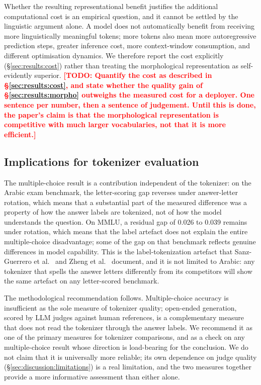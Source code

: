 \documentclass[a4paper,fleqn]{cas-sc}
\newcommand{\todo}[1]{\textcolor{red}{\textbf{[\textsc{TODO}: #1]}}}
\begin{document}
Whether the resulting representational benefit justifies the additional computational cost is an empirical question, and it cannot be settled by the linguistic argument alone. A model does not automatically benefit from receiving more linguistically meaningful tokens; more tokens also mean more autoregressive prediction steps, greater inference cost, more context-window consumption, and different optimisation dynamics. We therefore report the cost explicitly (\S\ref{sec:results:cost}) rather than treating the morphological representation as self-evidently superior.
\todo{Quantify the cost as described in \S\ref{sec:results:cost}, and state whether the quality gain of \S\ref{sec:results:morpho} outweighs the measured cost for a deployer. One sentence per number, then a sentence of judgement. Until this is done, the paper's claim is that the morphological representation is competitive with much larger vocabularies, not that it is more efficient.}

\subsection{Implications for tokenizer evaluation}
\label{sec:discussion:eval}

The multiple-choice result is a contribution independent of the tokenizer: on the Arabic exam benchmark, the letter-scoring gap reverses under answer-letter rotation, which means that a substantial part of the measured difference was a property of how the answer labels are tokenized, not of how the model understands the question. On MMLU, a residual gap of 0.026 to 0.039 remains under rotation, which means that the label artefact does not explain the entire multiple-choice disadvantage; some of the gap on that benchmark reflects genuine differences in model capability. This is the label-tokenization artefact that Sanz-Guerrero et al.\ \citep{sanzguerrero2025mind} and Zheng et al.\ \citep{zheng2024large} document, and it is not limited to Arabic: any tokenizer that spells the answer letters differently from its competitors will show the same artefact on any letter-scored benchmark.

The methodological recommendation follows. Multiple-choice accuracy is insufficient as the sole measure of tokenizer quality; open-ended generation, scored by LLM judges against human references, is a complementary measure that does not read the tokenizer through the answer labels. We recommend it as one of the primary measures for tokenizer comparisons, and as a check on any multiple-choice result whose direction is load-bearing for the conclusion. We do not claim that it is universally more reliable; its own dependence on judge quality (\S\ref{sec:discussion:limitations}) is a real limitation, and the two measures together provide a more informative assessment than either alone.
\end{document}
